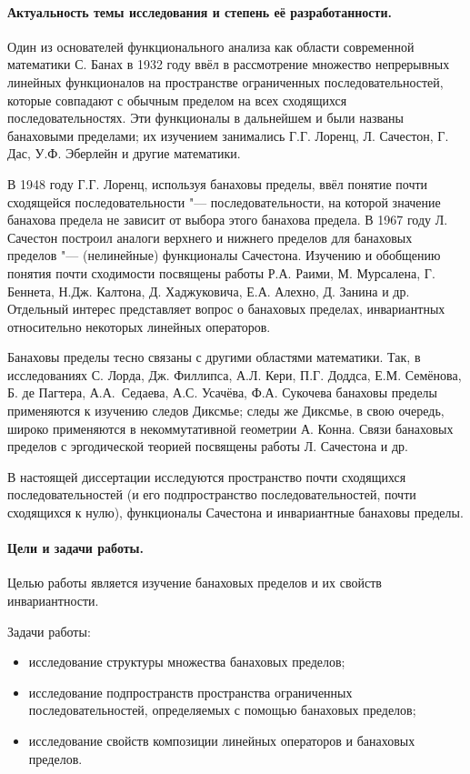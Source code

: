 \paragraph{Актуальность темы исследования и степень её разработанности.}

Один из основателей функционального анализа как области современной математики С. Банах
в 1932 году ввёл в рассмотрение множество непрерывных линейных функционалов на пространстве ограниченных последовательностей,
которые совпадают с обычным пределом на всех сходящихся последовательностях.
Эти функционалы в дальнейшем и были названы банаховыми пределами;
их изучением занимались Г.Г. Лоренц, Л. Сачестон, Г. Дас, У.Ф. Эберлейн и другие математики.

В 1948 году Г.Г. Лоренц, используя банаховы пределы, ввёл понятие почти сходящейся последовательности "---
последовательности, на которой значение банахова предела не зависит от выбора этого банахова предела.
В 1967 году Л. Сачестон построил аналоги верхнего и нижнего пределов для банаховых пределов "---
(нелинейные) функционалы Сачестона.
Изучению и обобщению понятия почти сходимости посвящены работы
Р.А. Раими, М. Мурсалена, Г. Беннета, Н.Дж. Калтона, Д. Хаджуковича, Е.А. Алехно, Д. Занина и др.
Отдельный интерес представляет вопрос о банаховых пределах, инвариантных относительно некоторых линейных операторов.

Банаховы пределы тесно связаны с другими областями математики.
Так, в исследованиях С. Лорда, Дж. Филлипса, А.Л. Кери, П.Г. Доддса, Е.М. Семёнова, Б. де Пагтера,
А.А.~Седаева, А.С. Усачёва, Ф.А. Сукочева банаховы пределы применяются к изучению следов Диксмье;
следы же Диксмье, в свою очередь, широко применяются в некоммутативной геометрии А. Конна.
Связи банаховых пределов с эргодической теорией посвящены работы Л. Сачестона и др.

В настоящей диссертации исследуются пространство почти сходящихся последовательностей
(и его подпространство последовательностей, почти сходящихся к нулю),
функционалы Сачестона и инвариантные банаховы пределы.

\paragraph{Цели и задачи работы.}
Целью работы является изучение банаховых пределов и их свойств инвариантности.

Задачи работы:
\begin{itemize}
	\item
		исследование структуры множества банаховых пределов;
	\item
		исследование подпространств пространства ограниченных последовательностей,
		определяемых с помощью банаховых пределов;
	\item
		исследование свойств композиции линейных операторов и банаховых пределов.
\end{itemize}


